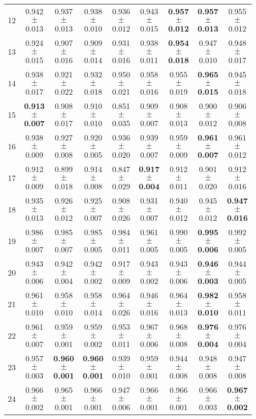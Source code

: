 \begin{table}[!ht]
{\begin{tabular}{r c c c c c c c c}
12 & 0.942 $\pm$ 0.013 & 0.937 $\pm$ 0.013 & 0.938 $\pm$ 0.010 & 0.936 $\pm$ 0.012 & 0.943 $\pm$ 0.015 & \textbf{0.957 $\pm$ 0.012} & \textbf{0.957 $\pm$ 0.013} & 0.955 $\pm$ 0.012 \\
13 & 0.924 $\pm$ 0.015 & 0.907 $\pm$ 0.016 & 0.909 $\pm$ 0.014 & 0.931 $\pm$ 0.016 & 0.938 $\pm$ 0.011 & \textbf{0.954 $\pm$ 0.018} & 0.947 $\pm$ 0.010 & 0.948 $\pm$ 0.017 \\
14 & 0.938 $\pm$ 0.017 & 0.921 $\pm$ 0.022 & 0.932 $\pm$ 0.018 & 0.950 $\pm$ 0.021 & 0.958 $\pm$ 0.016 & 0.955 $\pm$ 0.019 & \textbf{0.965 $\pm$ 0.015} & 0.945 $\pm$ 0.018 \\
15 & \textbf{0.913 $\pm$ 0.007} & 0.908 $\pm$ 0.017 & 0.910 $\pm$ 0.010 & 0.851 $\pm$ 0.035 & 0.909 $\pm$ 0.007 & 0.908 $\pm$ 0.013 & 0.900 $\pm$ 0.012 & 0.906 $\pm$ 0.008 \\
16 & 0.938 $\pm$ 0.009 & 0.927 $\pm$ 0.008 & 0.920 $\pm$ 0.005 & 0.936 $\pm$ 0.020 & 0.939 $\pm$ 0.007 & 0.959 $\pm$ 0.009 & \textbf{0.961 $\pm$ 0.007} & 0.961 $\pm$ 0.012 \\
17 & 0.912 $\pm$ 0.009 & 0.899 $\pm$ 0.018 & 0.914 $\pm$ 0.008 & 0.847 $\pm$ 0.029 & \textbf{0.917 $\pm$ 0.004} & 0.912 $\pm$ 0.011 & 0.901 $\pm$ 0.020 & 0.912 $\pm$ 0.016 \\
18 & 0.935 $\pm$ 0.013 & 0.926 $\pm$ 0.012 & 0.925 $\pm$ 0.007 & 0.908 $\pm$ 0.026 & 0.931 $\pm$ 0.007 & 0.940 $\pm$ 0.012 & 0.945 $\pm$ 0.012 & \textbf{0.947 $\pm$ 0.016} \\
19 & 0.986 $\pm$ 0.007 & 0.985 $\pm$ 0.007 & 0.985 $\pm$ 0.005 & 0.984 $\pm$ 0.011 & 0.961 $\pm$ 0.005 & 0.990 $\pm$ 0.005 & \textbf{0.995 $\pm$ 0.006} & 0.992 $\pm$ 0.005 \\
20 & 0.943 $\pm$ 0.006 & 0.942 $\pm$ 0.004 & 0.942 $\pm$ 0.002 & 0.917 $\pm$ 0.009 & 0.943 $\pm$ 0.002 & 0.943 $\pm$ 0.006 & \textbf{0.946 $\pm$ 0.003} & 0.944 $\pm$ 0.005 \\
21 & 0.961 $\pm$ 0.010 & 0.958 $\pm$ 0.010 & 0.958 $\pm$ 0.014 & 0.964 $\pm$ 0.026 & 0.946 $\pm$ 0.016 & 0.964 $\pm$ 0.013 & \textbf{0.982 $\pm$ 0.010} & 0.958 $\pm$ 0.011 \\
22 & 0.961 $\pm$ 0.007 & 0.959 $\pm$ 0.001 & 0.959 $\pm$ 0.002 & 0.953 $\pm$ 0.011 & 0.967 $\pm$ 0.006 & 0.968 $\pm$ 0.008 & \textbf{0.976 $\pm$ 0.004} & 0.976 $\pm$ 0.004 \\
23 & 0.957 $\pm$ 0.003 & \textbf{0.960 $\pm$ 0.001} & \textbf{0.960 $\pm$ 0.001} & 0.939 $\pm$ 0.010 & 0.959 $\pm$ 0.001 & 0.944 $\pm$ 0.008 & 0.948 $\pm$ 0.008 & 0.947 $\pm$ 0.008 \\
24 & 0.966 $\pm$ 0.002 & 0.965 $\pm$ 0.001 & 0.966 $\pm$ 0.001 & 0.947 $\pm$ 0.006 & 0.966 $\pm$ 0.001 & 0.966 $\pm$ 0.001 & 0.966 $\pm$ 0.003 & \textbf{0.967 $\pm$ 0.002} \\

\end{tabular}}
\end{table}
